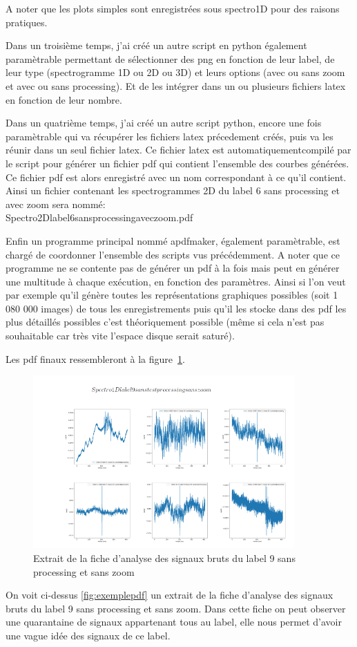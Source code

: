 A noter que les plots simples sont enregistrées sous spectro1D pour des raisons pratiques.

Dans un troisième temps, j'ai créé un autre script en python également paramètrable permettant de sélectionner des png en fonction de leur label, de leur type (spectrogramme 1D ou 2D ou 3D) et leurs options (avec ou sans zoom et avec ou sans processing).
Et de les intégrer dans un ou plusieurs fichiers latex en fonction de leur nombre.

Dans un quatrième temps, j'ai créé un autre script python, encore une fois paramètrable qui va récupérer les fichiers latex précedement créés, puis va les réunir dans un seul fichier latex.
Ce fichier latex est automatiquementcompilé par le script pour générer un fichier pdf
qui contient l'ensemble des courbes générées.
Ce fichier pdf est alors enregistré avec un nom correspondant à ce qu'il contient. Ainsi un fichier contenant les spectrogrammes 2D du label 6 sans processing et avec zoom sera nommé:\\ Spectro2Dlabel6sansprocessingaveczoom.pdf

Enfin un programme principal nommé apdfmaker, également paramètrable, est chargé de coordonner l'ensemble des scripts vus précédemment.
A noter que ce programme ne se contente pas de générer un pdf à la fois mais peut
en générer une multitude à chaque exécution, en fonction des paramètres.
Ainsi si l'on veut par exemple qu'il génère toutes les représentations graphiques possibles (soit 1 080 000 images) de tous les enregistrements puis qu'il les stocke dans des pdf les plus détaillés possibles c'est théoriquement possible (même si cela n'est pas souhaitable  car très vite l'espace disque serait saturé).

Les pdf finaux ressembleront à la figure~\ref{fig:exempledepdf}.

\begin{figure}[!h]
\centering
\includegraphics[width=10cm]{./images/pdfexemple.png}
\caption{Extrait de la fiche d'analyse des signaux bruts du label 9 sans processing et sans zoom%
\label{fig:exempledepdf}}
\end{figure}

On voit ci-dessus \ref{fig:exemplepdf} un extrait de la fiche d'analyse des signaux bruts du label 9 sans processing et sans zoom. Dans cette fiche on peut observer une quarantaine de signaux appartenant tous au label, elle nous permet d'avoir une vague idée des signaux de ce label.
